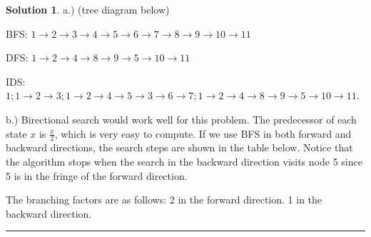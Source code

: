 \documentclass{article}
\theoremstyle{definition}
\def\fline{\rule{0.75\linewidth}{0.5pt}}
\newcommand{\finishline}{\begin{center}\fline\end{center}}
\newtheorem*{solution*}{Solution}
\newenvironment{solution}{\begin{solution*}}{{\finishline} \end{solution*}}
\begin{document}
\begin{solution}
	\item a.) (tree diagram below)
		\begin{figure}[h!]
			\centering
		 
		\end{figure}
	\item  BFS: $1 \rightarrow 2 \rightarrow 3 \rightarrow 4 \rightarrow 5 \rightarrow 6 \rightarrow 7 \rightarrow 8 \rightarrow 9 \rightarrow 10 \rightarrow 11$
	\item DFS: $1 \rightarrow 2 \rightarrow 4 \rightarrow 8 \rightarrow 9 \rightarrow 5 \rightarrow 10 \rightarrow 11$
	\item IDS: $1; 1 \rightarrow 2 \rightarrow 3; 1\rightarrow 2 \rightarrow 4 \rightarrow 5 \rightarrow 3 \rightarrow 6 \rightarrow 7; 1 \rightarrow 2 \rightarrow 4 \rightarrow 8 \rightarrow 9 \rightarrow 5 \rightarrow 10 \rightarrow 11.$

	\item b.) Birectional search would work well for this problem. The predecessor of each state $x$ is $\frac{x}{2}$, which is very easy to compute. If we use BFS in both forward and backward directions, the search steps are shown in the table below. Notice that the algorithm stops when the search in the backward direction visits node 5 since 5 is in the fringe of the forward direction. 
	\item 
		\begin{figure}[h!]
			\centering
		 
		\end{figure}
	\item The branching factors are as follows: 2 in the forward direction. 1 in the backward direction. 
	
\end{solution}
\end{document}

